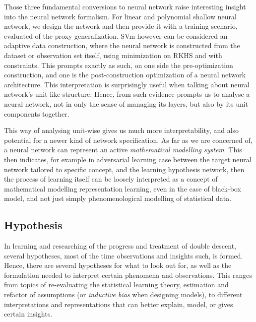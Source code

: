 \documentclass[10pt]{article} %
\begin{document}
Those three fundamental conversions to neural network raise interesting insight into the neural network formalism. For linear and polynomial shallow neural network, we design the network and then provide it with a training scenario, evaluated of the proxy generalization. SVm however can be considered an adaptive data construction, where the neural network is constructed from the dataset or observation set itself, using minimization on RKHS and with constraints. This prompts exactly as such, on one side the pre-optimization construction, and one is the post-construction optimization of a neural network architecture. This interpretation is surprisingly useful when talking about neural network's unit-like structure. Hence, from such evidence prompts us to analyse a neural network, not in only the sense of managing its layers, but also by its unit components together. 

This way of analysing unit-wise gives us much more interpretability, and also potential for a newer kind of network specification. As far as we are concerned of, a neural network can represent an active \textit{mathematical modelling system}. This then indicates, for example in adversarial learning case between the target neural network tailored to specific concept, and the learning hypothesis network, then the process of learning itself can be loosely interpreted as a concept of mathematical modelling representation learning, even in the case of black-box model, and not just simply phenomenological modelling of statistical data. 

\subsection{Hypothesis}

In learning and researching of the progress and treatment of double descent, several hypotheses, most of the time observations and insights such, is formed. Hence, there are several hypotheses for what to look out for, as well as the formulation needed to interpret certain phenomena and observations. This ranges from topics of re-evaluating the statistical learning theory, estimation and refactor of assumptions (or \textit{inductive bias} when designing models), to different interpretations and representations that can better explain, model, or gives certain insights.  
\end{document}
